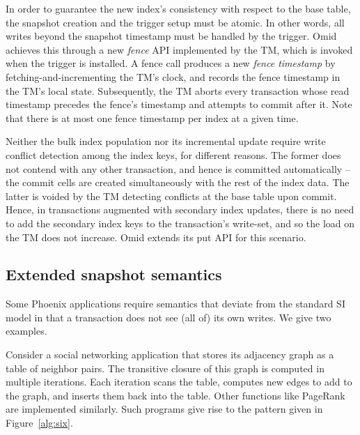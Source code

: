 In order to guarantee the new index's consistency with respect to the base table, the snapshot creation 
and the trigger setup must be atomic. In other words, all writes beyond the snapshot   
timestamp must be handled by the trigger. Omid achieves this through a new {\em fence\/} API
implemented by the TM, which is  invoked when the trigger is installed. 
A fence call produces a new \emph{fence timestamp} by fetching-and-incrementing the TM's clock, and 
records the fence timestamp in the TM's local state.  
Subsequently, the TM aborts every transaction whose read timestamp precedes the fence's 
timestamp and attempts to commit after it. 
Note that there is at most one fence timestamp per index at a given time.


Neither the bulk index population nor its incremental update require write conflict detection 
among the index keys, for different reasons. The former does not contend with any other 
transaction, and hence is committed automatically -- the commit cells are created simultaneously
with the rest of the index data. The latter is voided by the TM detecting conflicts at the base 
table upon commit. Hence, in transactions augmented with secondary index updates,  
there is no need to add the secondary index keys to the transaction's
write-set, and so the load on the TM does not increase. 
Omid extends its put API for this scenario. 


\subsection{Extended snapshot semantics}
\label{ssec:snapshot}

Some Phoenix applications require semantics that  
deviate from the standard SI model in that a transaction does not see (all of) its own writes.
We give two examples. 

Consider a social networking application that stores its adjacency graph 
as a table of neighbor pairs. The transitive closure of this graph is computed in
multiple iterations. Each iteration scans the table, computes new edges to add to the 
graph, and inserts them back into the table. Other functions like PageRank are implemented
similarly. Such programs give rise to the pattern given in Figure~\ref{alg:six}. 

